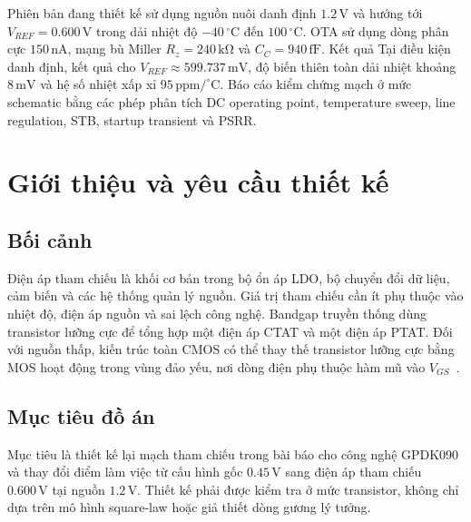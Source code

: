 \documentclass[11pt,a4paper]{report}
\newcommand{\SI}[2]{\ensuremath{#1\,\mathrm{#2}}}
\newcommand{\ohm}{\Omega}
\newcommand{\VDDnom}{\SI{1.2}{V}}
\newcommand{\VREFtarget}{\SI{0.600}{V}}
\newcommand{\Tmin}{\SI{-40}{^{\circ}C}}
\newcommand{\Tmax}{\SI{100}{^{\circ}C}}
\newcommand{\IBIASota}{\SI{150}{nA}}
\newcommand{\RzFinal}{\SI{240}{k\ohm}}
\newcommand{\CcFinal}{\SI{940}{fF}}
\begin{document}
Phiên bản đang thiết kế sử dụng nguồn nuôi danh định \VDDnom{} và hướng tới
$V_{REF}=\VREFtarget$ trong dải nhiệt độ \Tmin{} đến \Tmax. OTA sử dụng dòng
phân cực \IBIASota, mạng bù Miller $R_z=\RzFinal$ và $C_C=\CcFinal$. Kết quả
Tại điều kiện danh định, kết quả cho $V_{REF}\approx\SI{599.737}{mV}$, độ biến thiên
toàn dải nhiệt khoảng \SI{8}{mV} và hệ số nhiệt xấp xỉ
\SI{95}{ppm/^{\circ}C}. Báo cáo kiểm chứng mạch ở mức schematic bằng các phép
phân tích DC operating point, temperature sweep, line regulation, STB, startup
transient và PSRR.

\tableofcontents
\clearpage
{}

\chapter{Giới thiệu và yêu cầu thiết kế}

\section{Bối cảnh}
Điện áp tham chiếu là khối cơ bản trong bộ ổn áp LDO, bộ chuyển đổi dữ liệu,
cảm biến và các hệ thống quản lý nguồn. Giá trị tham chiếu cần ít phụ thuộc vào
nhiệt độ, điện áp nguồn và sai lệch công nghệ. Bandgap truyền thống dùng transistor
lưỡng cực để tổng hợp một điện áp CTAT và một điện áp PTAT. Đối với nguồn thấp,
kiến trúc toàn CMOS có thể thay thế transistor lưỡng cực bằng MOS hoạt động trong
vùng đảo yếu, nơi dòng điện phụ thuộc hàm mũ vào $V_{GS}$~\cite{madeira2017}.

\section{Mục tiêu đồ án}
Mục tiêu là thiết kế lại mạch tham chiếu trong bài báo cho công nghệ GPDK090 và
thay đổi điểm làm việc từ cấu hình gốc \SI{0.45}{V} sang điện áp tham chiếu
\VREFtarget{} tại nguồn \VDDnom. Thiết kế phải được kiểm tra ở mức transistor,
không chỉ dựa trên mô hình square-law hoặc giả thiết dòng gương lý tưởng.
\end{document}
